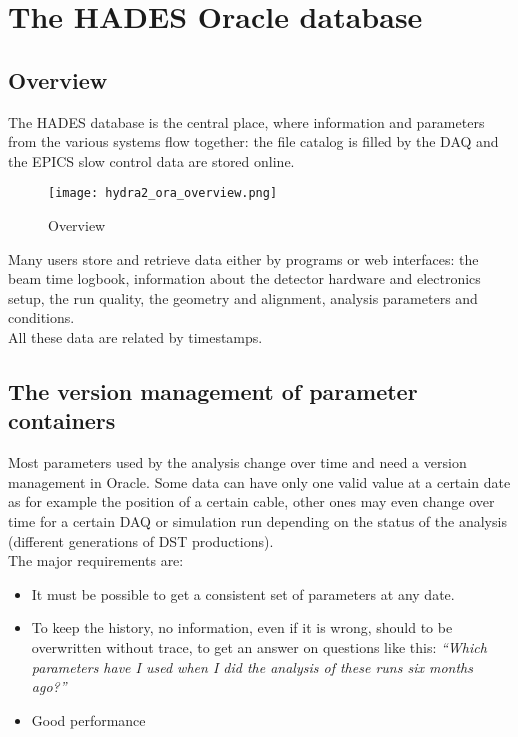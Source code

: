 \chapter[The HADES Oracle database]{The HADES Oracle database} \label{ch:oracle}

\section[Overview]{Overview}

The HADES database is the central place, where information and parameters from the various systems flow together:
the file catalog is filled by the DAQ and the EPICS slow control data are stored online.
\begin{figure}[\htb]
  \centering
  \texttt{[image: hydra2\_ora\_overview.png]}
  \caption[Overview]{ Overview} \label{fig:oraOverview}
\end{figure}

Many users store and retrieve data either by programs or web interfaces: the beam time logbook, information about the 
detector hardware and electronics setup, the run quality, the geometry and alignment, analysis parameters and conditions.\\
All these data are related by timestamps.


\section[The version management of parameter containers]{The version management of parameter containers} 
\label{sec:oraVersionmanagement}
Most parameters used by the analysis change over time and need a version management in Oracle. Some data can have only one 
valid value at a certain date as for example the position of a certain cable, other ones may even change over time for a 
certain DAQ or simulation run depending on the status of the analysis (different generations of DST productions).\\

The major requirements are:
\begin{itemize}
 \item It must be possible to get a consistent set of parameters at any date.
 \item To keep the history, no information, even if it is wrong, should to be overwritten without trace, to get an answer on 
       questions like this: \textit{``Which parameters have I used when I did the analysis of these runs six months ago?''}
 \item Good performance
\end{itemize}

